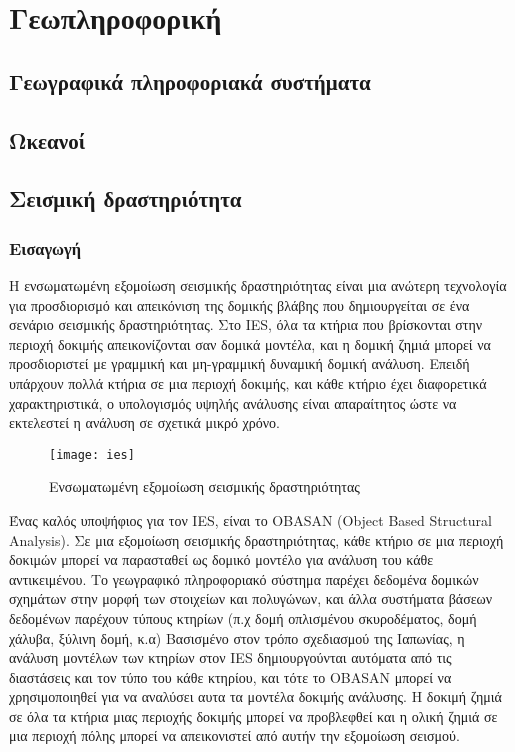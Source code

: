 \section{Γεωπληροφορική}
\subsection{Γεωγραφικά πληροφοριακά συστήματα}



\subsection{Ωκεανοί}

\subsection{Σεισμική δραστηριότητα}
\subsubsection{Εισαγωγή}
Η ενσωματωμένη εξομοίωση σεισμικής δραστηριότητας είναι μια ανώτερη τεχνολογία για προσδιορισμό και απεικόνιση της δομικής βλάβης που δημιουργείται σε ένα σενάριο σεισμικής δραστηριότητας. Στο IES, όλα τα κτήρια που βρίσκονται στην περιοχή δοκιμής απεικονίζονται σαν δομικά μοντέλα, και η δομική ζημιά μπορεί να προσδιοριστεί με γραμμική και μη-γραμμική δυναμική δομική ανάλυση. Επειδή υπάρχουν πολλά κτήρια σε μια περιοχή δοκιμής, και κάθε κτήριο έχει διαφορετικά χαρακτηριστικά, ο υπολογισμός υψηλής ανάλυσης είναι απαραίτητος ώστε να εκτελεστεί η ανάλυση σε σχετικά μικρό χρόνο.

\begin{figure}[h]
\centering
\texttt{[image: ies]}
\caption{Ενσωματωμένη εξομοίωση σεισμικής δραστηριότητας}
\end{figure}

Ένας καλός υποψήφιος για τον IES, είναι το OBASAN (Object Based Structural Analysis). Σε μια εξομοίωση σεισμικής δραστηριότητας, κάθε κτήριο σε μια περιοχή δοκιμών μπορεί να παρασταθεί ως δομικό μοντέλο για ανάλυση του κάθε αντικειμένου. Το γεωγραφικό πληροφοριακό σύστημα παρέχει δεδομένα δομικών σχημάτων στην μορφή των στοιχείων και πολυγώνων, και άλλα συστήματα βάσεων δεδομένων παρέχουν τύπους κτηρίων (π.χ δομή οπλισμένου σκυροδέματος, δομή χάλυβα, ξύλινη δομή, κ.α) Βασισμένο στον τρόπο σχεδιασμού της Ιαπωνίας, η ανάλυση μοντέλων των κτηρίων στον IES δημιουργούνται αυτόματα από τις διαστάσεις και τον τύπο του κάθε κτηρίου, και τότε το OBASAN μπορεί να χρησιμοποιηθεί για να αναλύσει αυτα τα μοντέλα δοκιμής ανάλυσης. Η δοκιμή ζημιά σε όλα τα κτήρια μιας περιοχής δοκιμής μπορεί να προβλεφθεί και η ολική ζημιά σε μια περιοχή πόλης μπορεί να απεικονιστεί από αυτήν την εξομοίωση σεισμού.

